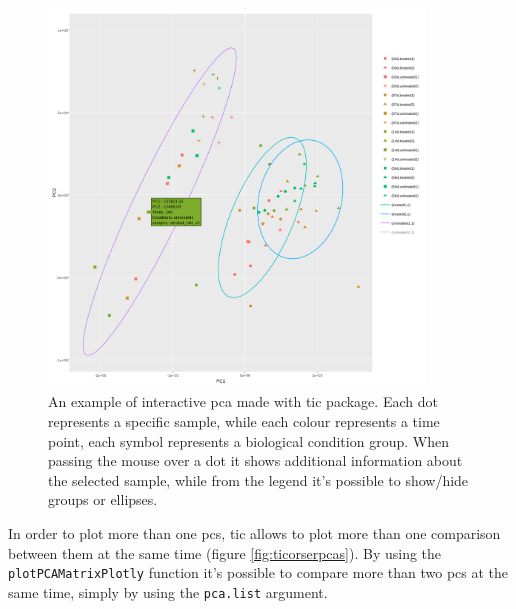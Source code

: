 \begin{figure}[H]
\centering
\includegraphics[width=10cm, keepaspectratio]{img/ticorser/pca_example.png}
\caption[ticorser pca]{An example of interactive \gls{pca} made with \gls{tic} package. Each dot represents a specific sample, while each colour represents a time point, each symbol represents a biological condition group. When passing the mouse over a dot it shows additional information about the selected sample, while from the legend it's possible to show/hide groups or ellipses.}
\label{fig:ticorserpca}

\end{figure}

In order to plot more than one \glspl{pc}, \gls{tic} allows to plot more than one comparison between them at the same time (figure \ref{fig:ticorserpcas}).
By using the \lstinline!plotPCAMatrixPlotly! function it's possible to compare more than two \glspl{pc} at the same time, simply by using the \lstinline!pca.list! argument.

